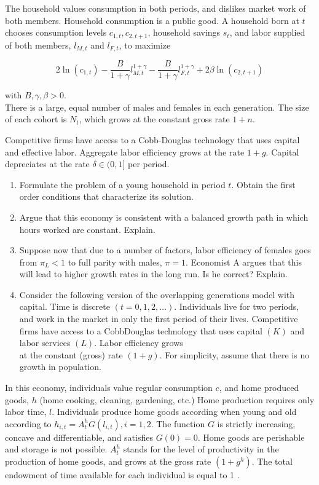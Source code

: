 \documentclass[10pt]{article}
\begin{document}
The household values consumption in both periods, and dislikes market work of both members. Household consumption is a public good. A household born at $t$ chooses consumption levels $c_{1, t}, c_{2, t+1}$, household savings $s_{t}$, and labor supplied of both members, $l_{M, t}$ and $l_{F, t}$, to maximize

$$
2 \ln \left(c_{1, t}\right)-\frac{B}{1+\gamma} l_{M, t}^{1+\gamma}-\frac{B}{1+\gamma} l_{F, t}^{1+\gamma}+2 \beta \ln \left(c_{2, t+1}\right)
$$

with $B, \gamma, \beta>0$.\\
There is a large, equal number of males and females in each generation. The size of each cohort is $N_{t}$, which grows at the constant gross rate $1+n$.

Competitive firms have access to a Cobb-Douglas technology that uses capital and effective labor. Aggregate labor efficiency grows at the rate $1+g$. Capital depreciates at the rate $\delta \in(0,1]$ per period.

\begin{enumerate}
  \item Formulate the problem of a young household in period $t$. Obtain the first order conditions that characterize its solution.
  \item Argue that this economy is consistent with a balanced growth path in which hours worked are constant. Explain.
  \item Suppose now that due to a number of factors, labor efficiency of females goes from $\pi_{L}<1$ to full parity with males, $\pi=1$. Economist A argues that this will lead to higher growth rates in the long run. Is he correct? Explain.
  \item Consider the following version of the overlapping generations model with capital. Time is discrete $(t=0,1,2, \ldots)$. Individuals live for two periods, and work in the market in only the first period of their lives. Competitive firms have access to a CobbDouglas technology that uses capital $(K)$ and labor services $(L)$. Labor efficiency grows\\
at the constant (gross) rate $(1+g)$. For simplicity, assume that there is no growth in population.
\end{enumerate}

In this economy, individuals value regular consumption $c$, and home produced goods, $h$ (home cooking, cleaning, gardening, etc.) Home production requires only labor time, $l$. Individuals produce home goods according when young and old according to $h_{i, t}=A_{t}^{h} G\left(l_{i, t}\right), i=1,2$. The function $G$ is strictly increasing, concave and differentiable, and satisfies $G(0)=0$. Home goods are perishable and storage is not possible. $A_{t}^{h}$ stands for the level of productivity in the production of home goods, and grows at the gross rate $\left(1+g^{h}\right)$. The total endowment of time available for each individual is equal to 1 .
\end{document}
